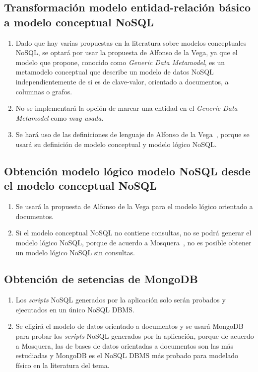 \subsection*{Transformación modelo entidad-relación básico a modelo conceptual NoSQL}
\begin{enumerate}
    \item Dado que hay varias propuestas en la literatura sobre modelos conceptuales NoSQL, se optará por usar la propuesta de Alfonso de la Vega\cite{de_la_vega_mortadelo_2020}, ya que el modelo que propone, conocido como \textit{Generic Data Metamodel}, es un metamodelo conceptual que describe un modelo de datos NoSQL independientemente de si es de clave-valor, orientado a documentos, a columnas o grafos.
    \item No se implementará la opción de marcar una entidad en el \textit{Generic Data Metamodel} como \textit{muy usada}.
    \item Se hará uso de las definiciones de lenguaje de Alfonso de la Vega~\cite{de_la_vega_mortadelo_2020}, porque se usará su definición de modelo conceptual y modelo lógico NoSQL.
\end{enumerate}

\subsection*{Obtención modelo lógico modelo NoSQL desde el modelo conceptual NoSQL}
\begin{enumerate}
    \item Se usará la propuesta de Alfonso de la Vega\cite{de_la_vega_mortadelo_2020} para el modelo lógico orientado a documentos.
    \item Si el modelo conceptual NoSQL no contiene consultas, no se podrá generar el modelo lógico NoSQL, porque de acuerdo a Mosquera~\cite{martinez-mosquera_modeling_2020}, no es posible obtener un modelo lógico NoSQL sin consultas.
\end{enumerate}

\subsection*{Obtención de setencias de MongoDB}
\begin{enumerate}
    \item Los \textit{scripts} NoSQL generados por la aplicación solo serán probados y ejecutados en un único NoSQL DBMS.
    \item Se eligirá el modelo de datos orientado a documentos y se usará MongoDB para probar los \textit{scripts} NoSQL generados por la aplicación, porque de acuerdo a Mosquera\cite{martinez-mosquera_modeling_2020}, las de bases de datos orientadas a documentos son las más estudiadas y MongoDB es el NoSQL DBMS más probado para modelado físico en la literatura del tema.
\end{enumerate}
    